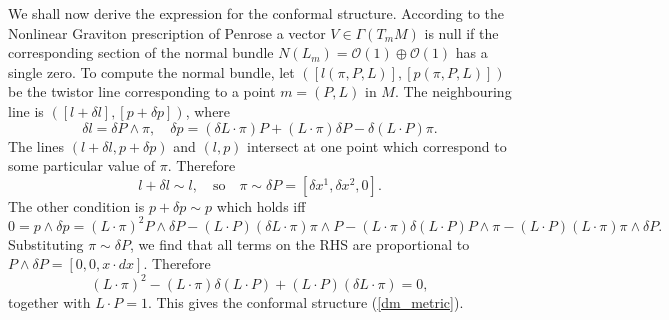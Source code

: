 We shall now derive the expression for the conformal structure. According
to the Nonlinear Graviton prescription of Penrose \cite{penrose} a vector
$V\in \Gamma(T_mM)$ is null if the corresponding section
of the normal bundle $N(L_m)={\mathcal O}(1)\oplus{\mathcal O}(1)$ has a 
single zero.  To compute the normal bundle, let $([l(\pi, P, L)], 
[p(\pi, P, L)])$
be the twistor line corresponding to a point $m=(P, L)$ in $M$. The neighbouring line is $([l+\delta l], [p+\delta p])$, where
\[
\delta l=\delta P\wedge \pi, \quad
\delta p= (\delta L\cdot \pi)P+(L\cdot\pi) \delta P-\delta (L\cdot P)\pi.
\]
The lines  $(l+\delta l, p+\delta p)$  and $(l, p)$ intersect at one point
which correspond to some particular value of $\pi$. Therefore
\[
l+\delta l\sim l, \quad\mbox{so}\quad \pi\sim\delta P=[\delta x^1, \delta x^2, 0].
\]
The other condition is $p+\delta p\sim p$ which holds iff 
\[
0=p\wedge \delta p=(L\cdot \pi)^2P\wedge \delta P-(L\cdot P)
(\delta L\cdot \pi)\pi\wedge P-(L\cdot \pi)\delta (L\cdot P)P\wedge \pi-
(L\cdot P)(L\cdot \pi) \pi\wedge \delta P.
\]
Substituting $\pi\sim\delta P$, we find that all terms on the RHS are proportional to $P\wedge \delta P=[0, 0, x\cdot dx]$.
Therefore
\[
(L\cdot \pi)^2-(L\cdot \pi)\delta(L\cdot P)+(L\cdot P)(\delta L\cdot \pi)=0,
\]
together with $L\cdot P=1$.  This gives the conformal structure 
(\ref{dm_metric}).
